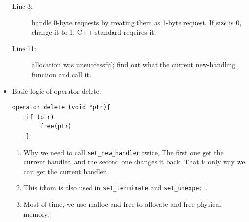 \documentclass[a4paper,11pt,twoside]{book}
\begin{document}
\begin{itemize}
\begin{description}
	\item[Line 3:] handle 0-byte requests by treating them as 1-byte request. If size is 0, change it to 1. C++ standard requires it.
	
	\item[Line 11:] allocation was unsuccessful; find out what the current new-handling function and call it.
\end{description}

\item Basic logic of operator delete.
\begin{lstlisting}[numbers=none]
operator delete (void *ptr){
	if (ptr)
		free(ptr)
	}
\end{lstlisting}

	\begin{enumerate}
		\item Why we need to call \texttt{set\_new\_handler} twice, The first one get the current handler, and the second one changes it back. That is only way we can get the current handler.
		
		\item This idiom is also used in \texttt{set\_terminate} and \texttt{set\_unexpect}. 
				
		\item Most of time, we use malloc and free to allocate and free physical memory.
	\end{enumerate}

\end{itemize}
\end{document}
